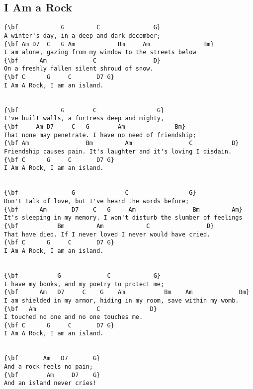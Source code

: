 \documentclass[a4paper]{article}
\begin{document}
\subsection{I Am a Rock} %
\label{sub:I Am a Rock}
\begin{Verbatim}[commandchars=\\\{\}]
{\bf            G         C               G}
A winter's day, in a deep and dark december;
{\bf Am D7  C   G Am            Bm     Am               Bm}
I am alone, gazing from my window to the streets below
{\bf      Am             C                D}
On a freshly fallen silent shroud of snow.
{\bf C      G     C       D7 G}
I Am A Rock, I am an island.


{\bf            G        C                 G}
I've built walls, a fortress deep and mighty,
{\bf     Am D7     C   G        Am              Bm}
That none may penetrate. I have no need of friendship;
{\bf Am                Bm         Am                C           D}
Friendship causes pain. It's laughter and it's loving I disdain.
{\bf C      G     C       D7 G}
I Am A Rock, I am an island.


{\bf               G              C                 G}
Don't talk of love, but I've heard the words before;
{\bf      Am       D7    C   G     Am                Bm         Am}
It's sleeping in my memory. I won't disturb the slumber of feelings
{\bf           Bm         Am            C                D}
That have died. If I never loved I never would have cried.
{\bf C      G     C       D7 G}
I Am A Rock, I am an island.


{\bf           G             C            G}
I have my books, and my poetry to protect me;
{\bf      Am   D7     C    G    Am           Bm    Am             Bm}
I am shielded in my armor, hiding in my room, save within my womb.
{\bf   Am                 C              D}
I touched no one and no one touches me.
{\bf C      G     C       D7 G}
I Am A Rock, I am an island.


{\bf       Am   D7       G}
And a rock feels no pain;
{\bf        Am     D7    G}
And an island never cries!
\end{Verbatim}
\newpage
\end{document}
